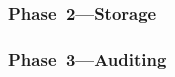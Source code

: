 \subsubsection{Phase~2---Storage} \label{sec:auditor:analysis:phase2}
\subsubsection{Phase~3---Auditing} \label{sec:auditor:analysis:phase3}

